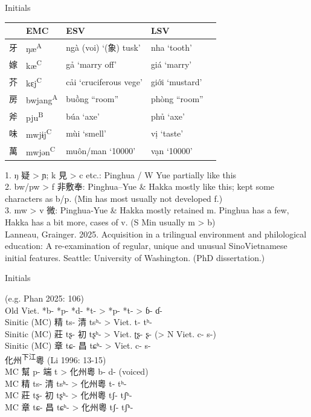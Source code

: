 \documentclass{beamer}
\begin{document}
\begin{frame}[fragile]{Initials}

\begin{tabular}{l l|l l l}
 & EMC & ESV & LSV\\ \hline
牙 & ŋæ\textsuperscript{A} & ngà (voi) \enquote*{(象) tusk} & nha \enquote*{tooth}\\
嫁 & kæ\textsuperscript{C} & gả \enquote*{marry off} & giá \enquote*{marry}\\
芥 & kɛj\textsuperscript{C} & cải \enquote*{cruciferous vege} & giới \enquote*{mustard}\\ \hline
房 & bwjang\textsuperscript{A} & buồng \enquote{room} & phòng \enquote{room}\\
斧 & pju\textsuperscript{B} & búa \enquote*{axe} & phủ \enquote*{axe}\\ \hline
味 & mwjɨj\textsuperscript{C} & mùi \enquote*{smell} & vị \enquote*{taste}\\
萬 & mwjən\textsuperscript{C} & muôn/man \enquote*{10000} & vạn \enquote*{10000}\\ 
\end{tabular}

\medskip
{\footnotesize
1. ŋ 疑 > ɲ; k 見 > c etc.: Pinghua / W Yue partially like this\\
2. bw/pw > f 非敷奉: Pinghua–Yue \& Hakka mostly like this; kept some characters as b/p. (Min has most usually not developed f.)\\
3. mw > v 微: Pinghua-Yue \& Hakka mostly retained m. Pinghua has a few, Hakka has a bit more, cases of v. (S Min usually m > b)}\\

\vfill {} {\tiny Lanneau, Grainger. 2025. Acquisition in a trilingual environment and philological education: A re-examination of regular, unique and unusual SinoVietnamese initial features. Seattle: University of Washington. (PhD dissertation.)}\par
\end{frame}

\begin{frame}[fragile]{Initials}

(e.g. Phan 2025: 106)\\
Old Viet. *b- *p- *d- *t- > *p- *t- > ɓ- ɗ-\\
Sinitic (MC) 精 ts- 清 tsʰ- > Viet. t- tʰ-\\
Sinitic (MC) 莊 tʂ- 初 tʂʰ- > Viet. ʈʂ- ʂ- (> N Viet. c- s-)\\
Sinitic (MC) 章 tɕ- 昌 tɕʰ- > Viet. c- s-\\
\bigskip
化州\textsuperscript{下江}粵 (Li 1996: 13-15)\\
MC 幫 p- 端 t > 化州粵 b- d- (voiced)\\
MC 精 ts- 清 tsʰ- > 化州粵 t- tʰ-\\
MC 莊 tʂ- 初 tʂʰ- > 化州粵 tʃ- tʃʰ-\\
MC 章 tɕ- 昌 tɕʰ- > 化州粵 tʃ- tʃʰ-\\  

\end{frame}
\end{document}
